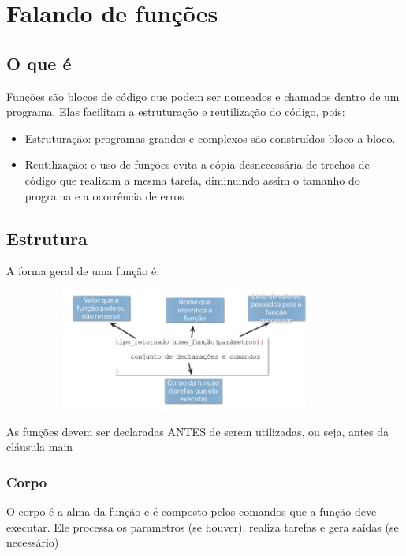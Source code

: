 \documentclass{report}
\begin{document}
	\chapter{Falando de funções}
	
	\section{O que é}
	Funções são blocos de código que podem ser nomeados e chamados dentro de um programa. Elas facilitam a estruturação e reutilização do código, pois:
	
	\begin{itemize}
		\item Estruturação: programas grandes e complexos são construídos bloco a bloco.
		\item Reutilização: o uso de funções evita a cópia desnecessária de trechos de código que realizam a mesma tarefa, diminuindo assim o tamanho do programa e a ocorrência de erros
	\end{itemize}
	
	\section{Estrutura}
	A forma geral de uma função é:
	
	\begin{center}
		
		\includegraphics[width=12cm,height=4cm,keepaspectratio=false]{imagens/func.png}
		
	\end{center}
	
	As funções devem ser declaradas ANTES de serem utilizadas, ou seja, antes da cláusula main
	
	\subsection{Corpo}
	
	O corpo é a alma da função e é composto pelos comandos que a função deve executar. Ele processa os parametros (se houver), realiza tarefas e gera saídas (se necessário)
	
\end{document}
